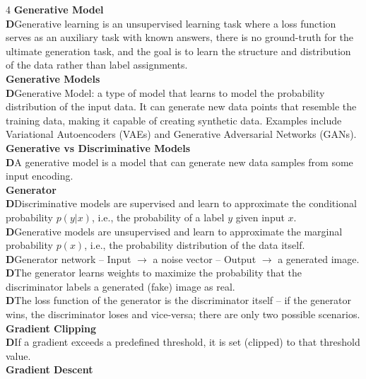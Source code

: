\documentclass[8pt]{extarticle}
\newcommand{\dtag}{\textcolor{definitioncolor}{\tiny\textbf{D}}\;}
\begin{document}
\begin{multicols}{4}
\vspace{2pt}\textbf{Generative Model}\\
\dtag Generative learning is an unsupervised learning task where a loss function serves as an auxiliary task with known answers, there is no ground-truth for the ultimate generation task, and the goal is to learn the structure and distribution of the data rather than label assignments.\\
\vspace{2pt}\textbf{Generative Models}\\
\dtag Generative Model: a type of model that learns to model the probability distribution of the input data. It can generate new data points that resemble the training data, making it capable of creating synthetic data. Examples include Variational Autoencoders (VAEs) and Generative Adversarial Networks (GANs).\\
\vspace{2pt}\textbf{Generative vs Discriminative Models}\\
\dtag A generative model is a model that can generate new data samples from some input encoding.\\
\vspace{2pt}\textbf{Generator}\\
\dtag Discriminative models are supervised and learn to approximate the conditional probability $p(y|x)$, i.e., the probability of a label $ y$ given input $ x$.\\
\dtag Generative models are unsupervised and learn to approximate the marginal probability $p(x)$, i.e., the probability distribution of the data itself.\\
\dtag Generator network -- Input $\rightarrow$ a noise vector -- Output $\rightarrow$ a generated image.\\
\dtag The generator learns weights to maximize the probability that the discriminator labels a generated (fake) image as real.\\
\dtag The loss function of the generator is the discriminator itself -- if the generator wins, the discriminator loses and vice-versa; there are only two possible scenarios.\\
\vspace{2pt}\textbf{Gradient Clipping}\\
\dtag If a gradient exceeds a predefined threshold, it is set (clipped) to that threshold value.\\
\vspace{2pt}\textbf{Gradient Descent}\\

\end{multicols}
\end{document}
